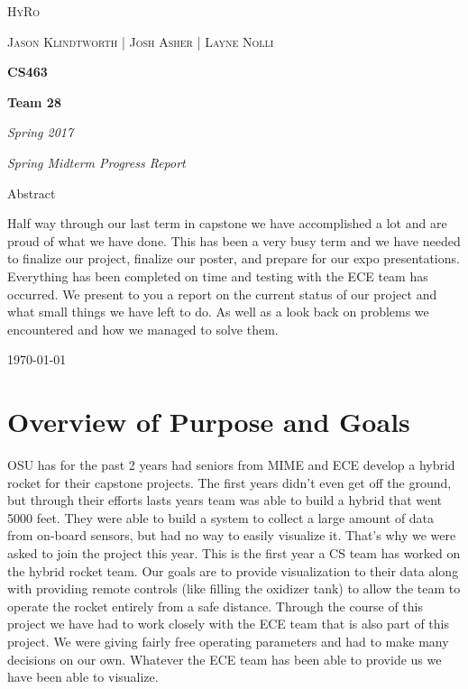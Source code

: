 \documentclass[10pt,draftclsnofoot,onecolumn]{IEEEtran}
\begin{document}
\begin{titlepage}
	\centering
	{\scshape\LARGE HyRo \par}
	\vspace{1cm}
	{\scshape\Large Jason Klindtworth  |  Josh Asher  |   Layne Nolli\par}
	\vspace{1.5cm}
	{\huge\bfseries CS463\par}
	\vspace{2cm}
	{\huge\bfseries Team 28\par}
	\vspace{2cm}
	{\Large\itshape Spring 2017\par}
	\vspace{4cm}
	{\Large\itshape Spring Midterm Progress Report\par}
	\vspace{4cm}
	{\large Abstract\par}
	\vspace{1cm}
	Half way through our last term in capstone we have accomplished a lot and are proud of what we have done. This has been a very busy term and we have
	needed to finalize our project, finalize our poster, and prepare for our expo presentations. Everything has been completed on time and testing with the ECE team has occurred. We present to you a report on the current status of our project and what small things we have left to do. As well as a look back on problems we encountered and how we managed to solve them.\par

	\vfill

	{\large \today\par}
\end{titlepage}


\section{Overview of Purpose and Goals}
OSU has for the past 2 years had seniors from MIME and ECE develop a hybrid rocket for their capstone projects. The first years didn't even get off the ground, but through their efforts lasts years team was able to build a hybrid that went 5000 feet. They were able to build a system to collect a large amount of data from on-board sensors, but had no way to easily visualize it. That's why we were asked to join the project this year. This is the first year a CS team has worked on the hybrid rocket team. Our goals are to provide visualization to their data along with providing remote controls (like filling the oxidizer tank) to allow the team to operate the rocket entirely from a safe distance. Through the course of this project we have had to work closely with the ECE team that is also part of this project. We were giving fairly free operating parameters and had to make many decisions on our own. Whatever the ECE team has been able to provide us we have been able to visualize. \par
\end{document}
